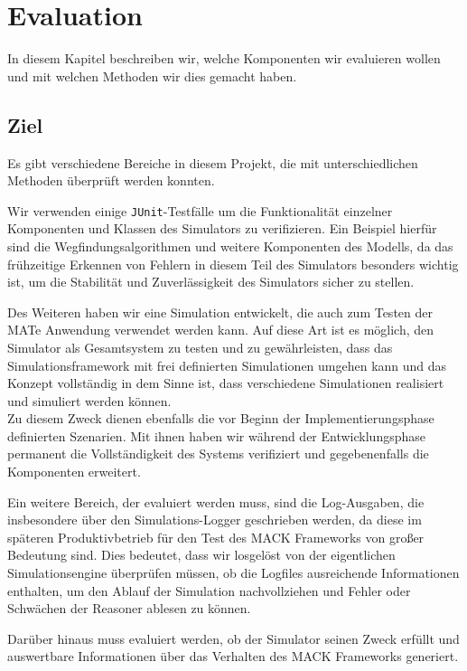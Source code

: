 \chapter{Evaluation}\label{chapter:eval}
In diesem Kapitel beschreiben wir, welche Komponenten wir evaluieren wollen und mit welchen Methoden wir dies gemacht haben.
\section{Ziel}\label{sec:eva_goal}
Es gibt verschiedene Bereiche in diesem Projekt, die mit unterschiedlichen Methoden überprüft werden konnten.

Wir verwenden einige \texttt{JUnit}-Testfälle um die Funktionalität einzelner Komponenten und Klassen des Simulators zu verifizieren. Ein Beispiel hierfür sind die Wegfindungsalgorithmen und weitere Komponenten des Modells, da das frühzeitige Erkennen von Fehlern in diesem Teil des Simulators besonders wichtig ist, um die Stabilität und Zuverlässigkeit des Simulators sicher zu stellen.

Des Weiteren haben wir eine Simulation entwickelt, die auch zum Testen der MATe Anwendung verwendet werden kann. Auf diese Art ist es möglich, den Simulator als Gesamtsystem zu testen und zu gewährleisten, dass das Simulationsframework mit frei definierten Simulationen umgehen kann und das Konzept vollständig in dem Sinne ist, dass verschiedene Simulationen realisiert und simuliert werden können.\\
Zu diesem Zweck dienen ebenfalls die vor Beginn der Implementierungsphase definierten Szenarien. Mit ihnen haben wir während der Entwicklungsphase permanent die Vollständigkeit des Systems verifiziert und gegebenenfalls die Komponenten erweitert.

Ein weitere Bereich, der evaluiert werden muss, sind die Log-Ausgaben, die insbesondere über den Simulations-Logger geschrieben werden, da diese im späteren Produktivbetrieb für den Test des MACK Frameworks von großer Bedeutung sind. Dies bedeutet, dass wir losgelöst von der eigentlichen Simulationsengine überprüfen müssen, ob die Logfiles ausreichende Informationen enthalten, um den Ablauf der Simulation nachvollziehen und Fehler oder Schwächen der Reasoner ablesen zu können.

Darüber hinaus muss evaluiert werden, ob der Simulator seinen Zweck erfüllt und auswertbare Informationen über das Verhalten des MACK Frameworks generiert.

